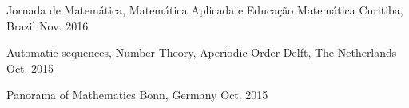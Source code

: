 \begin{cvhonors}
\cvhonor
  {Jornada de Matemática, Matemática Aplicada e Educação Matemática} %
  {Curitiba, Brazil} %
  {Nov. 2016} %

\cvhonor
  {Automatic sequences, Number Theory, Aperiodic Order} %
  {Delft, The Netherlands} %
  {Oct. 2015} %

\cvhonor
  {Panorama of Mathematics} %
  {Bonn, Germany} %
  {Oct. 2015} %

\end{cvhonors}

